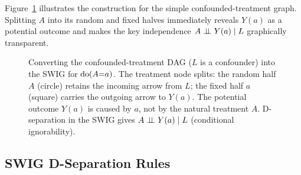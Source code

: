 \documentclass[master.tex]{subfiles}
\begin{document}
Figure~\ref{w4:fig:swig} illustrates the construction for the simple
confounded-treatment graph.  Splitting $A$ into its random and fixed
halves immediately reveals $Y(a)$ as a potential outcome and makes the
key independence $A \perp\!\!\!\perp Y(a) \mid L$ graphically transparent.

\begin{figure}[ht]
\centering
{}
\caption{Converting the confounded-treatment DAG ($L$ is a confounder)
  into the SWIG for $\mathrm{do}(A{=}a)$.  The treatment node splits: the
  random half $A$ (circle) retains the incoming arrow from $L$; the
  fixed half $a$ (square) carries the outgoing arrow to $Y(a)$.
  The potential outcome $Y(a)$ is caused by $a$, not by the natural
  treatment $A$.  D-separation in the SWIG gives
  $A \perp\!\!\!\perp Y(a) \mid L$ (conditional ignorability).}
\label{w4:fig:swig}
\end{figure}

\subsection{SWIG D-Separation Rules}
\label{w4:subsec:swig-dsep}
\end{document}
